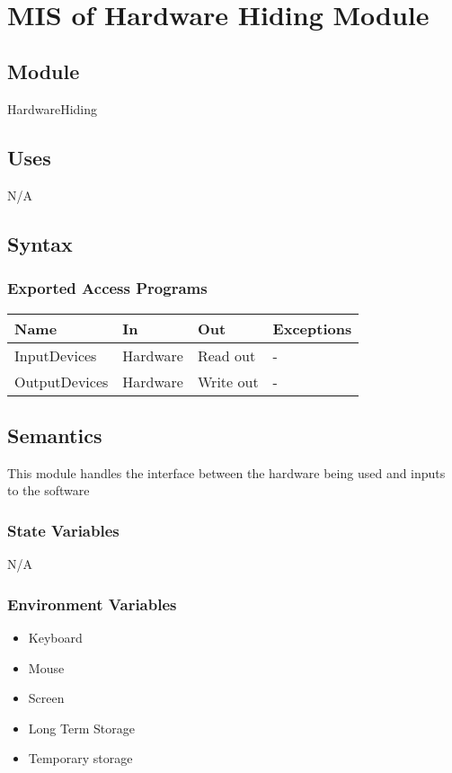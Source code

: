 \documentclass[12pt, titlepage]{article}
\begin{document}
\newpage
~\newpage

\section{MIS of Hardware Hiding Module} \label{Mod:HH}

\subsection{Module}
HardwareHiding

\subsection{Uses}
N/A

\subsection{Syntax}

\subsubsection{Exported Access Programs}

\begin{center}
\begin{tabular}{p{2cm} p{4cm} p{4cm} p{2cm}}
\hline
\textbf{Name} & \textbf{In} & \textbf{Out} & \textbf{Exceptions} \\
\hline
InputDevices & Hardware & Read out & - \\
OutputDevices & Hardware & Write out & - \\
\hline
\end{tabular}
\end{center}

\subsection{Semantics}
This module handles the interface between the hardware being used and inputs to the software

\subsubsection{State Variables}
N/A

\subsubsection{Environment Variables}
\begin{itemize}
    \item Keyboard
    \item Mouse
    \item Screen
    \item Long Term Storage
    \item Temporary storage
\end{itemize}
\end{document}

